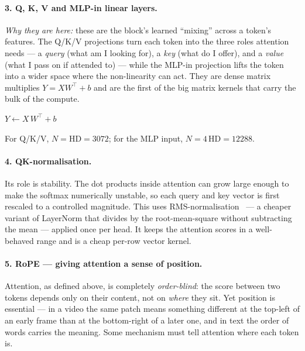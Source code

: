 \documentclass[11pt]{report}
\begin{document}
\paragraph{3. Q, K, V and MLP-in linear layers.} \emph{Why they are here:}
these are the block's learned ``mixing'' across a token's features. The
Q/K/V projections turn each token into the three roles attention needs ---
a \emph{query} (what am I looking for), a \emph{key} (what do I offer), and
a \emph{value} (what I pass on if attended to) --- while the MLP-in
projection lifts the token into a wider space where the non-linearity can
act. They are dense matrix multiplies $Y = X W^\top + b$ and are the first
of the big matrix kernels that carry the bulk of the compute.

\begin{algorithm}[H]
\DontPrintSemicolon
{}
$Y \leftarrow X\,W^\top + b$ 
\caption{Linear layer ($Y=XW^\top+b$)}
\end{algorithm}

For Q/K/V, $N=\mathrm{HD}=3072$; for the MLP input, $N=4\,\mathrm{HD}=12288$.

\paragraph{4. QK-normalisation.} Its role is stability. The dot products
inside attention can grow large enough to make the softmax numerically
unstable, so each query and key vector is first rescaled to a controlled
magnitude. This uses RMS-normalisation~\cite{zhang2019rmsnorm} --- a
cheaper variant of LayerNorm that divides by the root-mean-square without
subtracting the mean --- applied once per head. It keeps the attention
scores in a well-behaved range and is a cheap per-row vector kernel.

\paragraph{5. RoPE --- giving attention a sense of position.} Attention,
as defined above, is completely \emph{order-blind}: the score between two
tokens depends only on their content, not on \emph{where} they sit. Yet
position is essential --- in a video the same patch means something
different at the top-left of an early frame than at the bottom-right of a
later one, and in text the order of words carries the meaning. Some
mechanism must tell attention where each token is.
\end{document}
